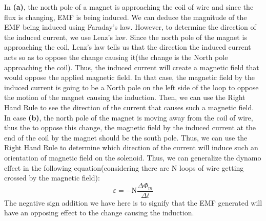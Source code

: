 \documentclass[11pt]{article}
\begin{document}
	In \textbf{(a)}, the north pole of a magnet is approaching the coil of wire and since the flux is changing, EMF is being induced. We can deduce the magnitude of the EMF being induced using Faraday's law. However, to determine the direction of the induced current, we use Lenz's law. Since the north pole of the magnet is approaching the coil, Lenz's law tells us that the direction the induced current acts so as to oppose the change causing it(the change is the North pole approaching the coil). Thus, the induced current will create a magnetic field that would oppose the applied magnetic field. In that case, the magnetic field by the induced current is going to be a North pole on the left side of the loop to oppose the motion of the magnet causing the induction. Then, we can use the Right Hand Rule to see the direction of the current that causes such a magnetic field. \newline\newline
	In case \textbf{(b)}, the north pole of the magnet is moving away from the coil of wire, thus the to oppose this change, the magnetic field by the induced current at the end of the coil by the magnet should be the south pole. Thus, we can use the Right Hand Rule to determine which direction of the current will induce such an orientation of magnetic field on the solenoid.\newline\newline
	Thus, we can generalize the dynamo effect in the following equation(considering there are N loops of wire getting crossed by the magnetic field):
	$$\varepsilon=-\text{N}\dfrac{\Delta\Phi_m}{\Delta t}$$
	The negative sign addition we have here is to signify that the EMF generated will have an opposing effect to the change causing the induction.
\end{document}
